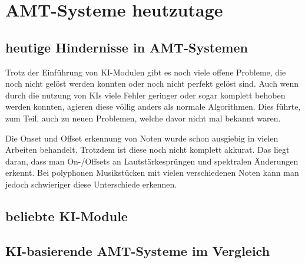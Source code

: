\section{AMT-Systeme heutzutage}

\subsection{heutige Hindernisse in AMT-Systemen}
Trotz der Einführung von KI-Modulen gibt es noch viele offene Probleme, die noch nicht gelöst werden konnten
oder noch nicht perfekt gelöst sind.
Auch wenn durch die nutzung von KIs viele Fehler geringer oder sogar komplett behoben werden konnten,
agieren diese völlig anders als normale Algorithmen.
Dies führte, zum Teil, auch zu neuen Problemen, welche davor nicht mal bekannt waren.

Die Onset und Offset erkennung von Noten wurde schon ausgiebig in vielen Arbeiten behandelt.
Trotzdem ist diese noch nicht komplett akkurat.
Das liegt daran, dass man On-/Offsets an Lautstärkesprüngen und spektralen Änderungen erkennt.
Bei polyphonen Musikstücken mit vielen verschiedenen Noten kann man jedoch schwieriger diese Unterschiede erkennen.


\subsection{beliebte KI-Module}

\subsection{KI-basierende AMT-Systeme im Vergleich}
